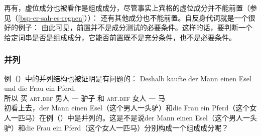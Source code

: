 再有，虚位成分也被看作是组成成分，尽管事实上宾格的虚位成分并不能前置（参见（\ref{bsp-er-sah-es-regnen}））：
\eal
{}
\zl
还有其他成分也不能前置。自反身代词就是一个很好的例子：
\eal
{}
\zl
由此可见，前置并不是成分测试的必要条件。这样的话，要判断一个给定词串是否是组成成分，它能否前置既不是充分条件，也不是必要条件。


\subsubsection{并列}
\label{Abschnitt-K-Tests-Koordination}
例（）中的并列结构也被证明是有问题的：
\ea
\label{ex-gapping}
\gll Deshalb kaufte der Mann einen Esel und die Frau ein Pferd.\\
	 所以 买 \textsc{art}.\textsc{def} 男人 一 驴子 和 \textsc{art}.\textsc{def} 女人 一 马\\
\z
初看上去，der Mann einen Esel（这个男人一头驴）和die Frau ein Pferd（这个女人一匹马）在例（）中是并列的。这是不是说der Mann einen Esel（这个男人一头驴）和die Frau ein Pferd（这个女人一匹马）分别构成一个组成成分呢？

